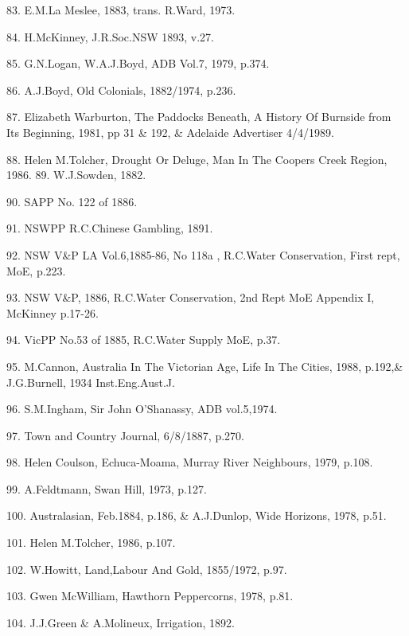 83. E.M.La Meslee, 1883, trans. R.Ward, 1973.

84. H.McKinney, J.R.Soc.NSW 1893, v.27.

85. G.N.Logan, W.A.J.Boyd, ADB Vol.7, 1979, p.374.

86. A.J.Boyd, Old Colonials, 1882/1974, p.236.

87. Elizabeth Warburton, The Paddocks Beneath, A History Of Burnside from
       Its Beginning, 1981, pp 31 \& 192, \& Adelaide Advertiser 4/4/1989.

88. Helen M.Tolcher, Drought Or Deluge, Man In The Coopers Creek Region,
       1986.								         
89. W.J.Sowden, 1882.

90. SAPP No. 122 of 1886.

91. NSWPP R.C.Chinese Gambling, 1891.

92. NSW V\&P LA Vol.6,1885-86, No 118a , R.C.Water Conservation, First 
      rept, MoE, p.223. 

93. NSW V\&P, 1886, R.C.Water Conservation, 2nd Rept 
      MoE Appendix I, McKinney p.17-26.		  

94. VicPP No.53 of 1885, R.C.Water Supply MoE, p.37.

95. M.Cannon, Australia In The Victorian Age, Life In The Cities, 1988,
       p.192,\&  J.G.Burnell, 1934 Inst.Eng.Aust.J.

96. S.M.Ingham, Sir John O'Shanassy, ADB vol.5,1974.

97. Town and Country Journal, 6/8/1887, p.270.

98. Helen Coulson, Echuca-Moama, Murray River Neighbours, 1979, p.108.

99. A.Feldtmann, Swan Hill, 1973, p.127.

100. Australasian, Feb.1884, p.186, \& A.J.Dunlop, Wide Horizons, 1978,
        p.51.

101. Helen M.Tolcher, 1986, p.107.

102. W.Howitt, Land,Labour And Gold, 1855/1972, p.97.

103. Gwen McWilliam, Hawthorn Peppercorns, 1978, p.81.

104. J.J.Green \& A.Molineux, Irrigation, 1892.





